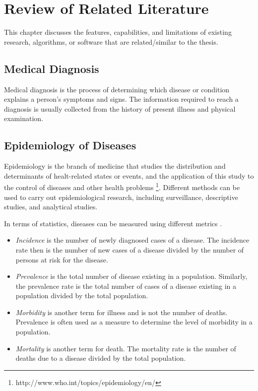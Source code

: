 %
%
%                 

\chapter{Review of Related Literature}
\label{sec:relatedlit}

This chapter discusses the features, capabilities, and limitations of existing research, algorithms, or software 
that are related/similar to the thesis.

\section{Medical Diagnosis}
Medical diagnosis is the process of determining which disease or condition explains a person's symptoms and signs. 
The information required to reach a diagnosis is usually collected from the history of present illness and physical examination.

\section{Epidemiology of Diseases}
Epidemiology is the branch of medicine that studies the distribution and determinants of healt-related states or events, and the application of this study to the control of diseases and other health problems \footnote{http://www.who.int/topics/epidemiology/en/}.
Different methods can be used to carry out epidemiological research, including surveillance, descriptive studies, and analytical studies.

In terms of statistics, diseases can be measured using different metrics \cite{nydoh:1999}. 
\begin{itemize}
\item \textit{Incidence} is the number of newly diagnosed cases of a disease. The incidence rate then is the number of new cases of a disease divided by the number of persons at risk for the disease.
\item \textit{Prevalence} is the total number of disease existing in a population. 
Similarly, the prevalence rate is the total number of cases of a disease existing in a population divided by the total population.
\item \textit{Morbidity} is another term for illness and is not the number of deaths. 
Prevalence is often used as a measure to determine the level of morbidity in a population.
\item \textit{Mortality} is another term for death. The mortality rate is the number of deaths due to a disease divided by the total population.
\end{itemize}

